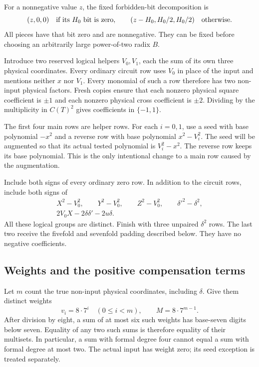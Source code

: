 For a nonnegative value $z$, the fixed forbidden-bit decomposition is
\begin{equation}\label{eq:product-bound-split}
 (z,0,0)\quad\hbox{if its $H_0$ bit is zero},\qquad
 (z-H_0,H_0/2,H_0/2)\quad\hbox{otherwise}.
\end{equation}
All pieces have that bit zero and are nonnegative. They can be fixed
before choosing an arbitrarily large power-of-two radix $B$.

Introduce two reserved logical helpers $V_0,V_1$, each the sum of its
own three physical coordinates. Every ordinary circuit row uses
$V_0$ in place of the input and mentions neither $x$ nor $V_1$.
Every monomial of such a row therefore has two non-input physical
factors. Fresh copies ensure that each nonzero physical square
coefficient is $\pm1$ and each nonzero physical cross coefficient is
$\pm2$. Dividing by the multiplicity in $C(T)^2$ gives coefficients
in $\{-1,1\}$.

The first four main rows are helper rows. For each $i=0,1$, use a
seed with base polynomial $-x^2$ and a reverse row with base
polynomial $x^2-V_i^2$. The seed will be augmented so that its actual
tested polynomial is $V_i^2-x^2$. The reverse row keeps its base
polynomial. This is the only intentional change to a main row caused
by the augmentation.

Include both signs of every ordinary zero row. In addition to the
circuit rows, include both signs of
\begin{equation}\label{eq:product-bound-normalization}
\begin{gathered}
 X^2-V_0^2,\qquad Y^2-V_0^2,\qquad Z^2-V_0^2,
 \qquad \delta'^2-\delta^2,\\
 2V_0X-2\delta\delta'-2u\delta.
\end{gathered}
\end{equation}
All these logical groups are distinct. Finish with three unpaired
$\delta^2$ rows. The last two receive the fivefold and sevenfold
padding described below. They have no negative coefficients.

\subsection{Weights and the positive compensation terms}

Let $m$ count the true non-input physical coordinates, including
$\delta$. Give them distinct weights
\begin{equation}\label{eq:product-bound-weights}
 v_i=8\cdot7^i\quad(0\le i<m),\qquad M=8\cdot7^{m-1}.
\end{equation}
After division by eight, a sum of at most six such weights has
base-seven digits below seven. Equality of any two such sums is
therefore equality of their multisets. In particular, a sum with
formal degree four cannot equal a sum with formal degree at most two.
The actual input has weight zero; its seed exception is treated
separately.

